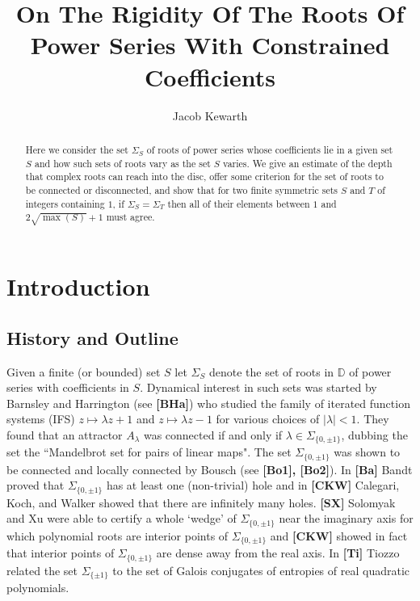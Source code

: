 \documentclass[11pt]{amsart}
\numberwithin{theorem}{section} %
\numberwithin{corollary}{section}
\numberwithin{lemma}{section}
\numberwithin{proposition}{section}
\numberwithin{definition}{section}
\begin{document}
\title[On The Rigidity Of The Roots Of Power Series]{On The Rigidity Of The Roots Of Power Series With Constrained Coefficients}

\author{Jacob Kewarth}

\begin{abstract}
Here we consider the set $\Sigma_S$ of roots of power series whose coefficients lie in a given set $S$ and how such sets of roots vary as the set $S$ varies. We give an estimate of the depth that complex roots can reach into the disc, offer some criterion for the set of roots to be connected or disconnected, and show that for two finite symmetric sets $S$ and $T$ of integers containing $1$, if $\Sigma_S = \Sigma_T$ then all of their elements between $1$ and $2\sqrt{\max(S)}+1$ must agree.
\end{abstract}

\maketitle


\section{Introduction}

\subsection{History and Outline}




Given a finite (or bounded) set $S$ let $\Sigma_S$ denote the set of roots in $\mathbb{D}$ of power series with coefficients in $S$. Dynamical interest in such sets was started by Barnsley and Harrington (see \textbf{[BHa]}) who studied the family of iterated function systems (IFS) $z \mapsto \lambda z +1$ and $z \mapsto \lambda z - 1$ for various choices of $|\lambda| < 1$. They found that an attractor $A_\lambda$ was connected if and only if $\lambda \in \Sigma_{ \{ 0, \pm 1\} }$, dubbing the set the  ``Mandelbrot set for pairs of linear maps". The set $\Sigma_{ \{ 0, \pm 1 \}}$ was shown to be connected and locally connected by Bousch (see \textbf{[Bo1], [Bo2]}). In \textbf{[Ba]} Bandt proved that $\Sigma_{ \{ 0, \pm 1 \} }$ has at least one (non-trivial) hole and in \textbf{[CKW]} Calegari, Koch, and Walker showed that there are infinitely many holes. \textbf{[SX]} Solomyak and Xu were able to certify a whole `wedge' of $\Sigma_{ \{ 0, \pm 1 \}}$ near the imaginary axis for which polynomial roots are interior points of $\Sigma_{ \{0, \pm 1 \} }$ and \textbf{[CKW]} showed in fact that interior points of $\Sigma_{ \{ 0, \pm 1 \}}$ are dense away from the real axis. In \textbf{[Ti]} Tiozzo related the set $\Sigma_{ \{\pm 1 \} }$ to the set of Galois conjugates of entropies of real quadratic polynomials.
\end{document}
